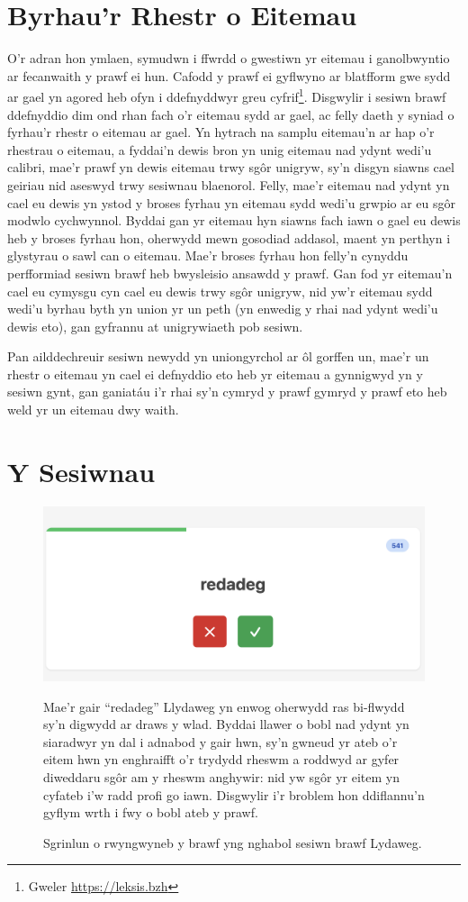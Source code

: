\section{Byrhau'r Rhestr o Eitemau}
O'r adran hon ymlaen, symudwn i ffwrdd o gwestiwn yr eitemau i ganolbwyntio ar fecanwaith y prawf ei hun. Cafodd y prawf ei gyflwyno ar blatfform gwe sydd ar gael yn agored heb ofyn i ddefnyddwyr greu cyfrif\footnote{Gweler \href{https://leksis.bzh}{https://leksis.bzh}}. Disgwylir i sesiwn brawf ddefnyddio dim ond rhan fach o'r eitemau sydd ar gael, ac felly daeth y syniad o fyrhau'r rhestr o eitemau ar gael. Yn hytrach na samplu eitemau'n ar hap o'r rhestrau o eitemau, a fyddai'n dewis bron yn unig eitemau nad ydynt wedi'u calibri, mae'r prawf yn dewis eitemau trwy sgôr unigryw, sy'n disgyn siawns cael geiriau nid aseswyd trwy sesiwnau blaenorol. Felly, mae'r eitemau nad ydynt yn cael eu dewis yn ystod y broses fyrhau yn eitemau sydd wedi'u grwpio ar eu sgôr modwlo cychwynnol. Byddai gan yr eitemau hyn siawns fach iawn o gael eu dewis heb y broses fyrhau hon, oherwydd mewn gosodiad addasol, maent yn perthyn i glystyrau o sawl can o eitemau. Mae'r broses fyrhau hon felly'n cynyddu perfformiad sesiwn brawf heb bwysleisio ansawdd y prawf. Gan fod yr eitemau'n cael eu cymysgu cyn cael eu dewis trwy sgôr unigryw, nid yw'r eitemau sydd wedi'u byrhau byth yn union yr un peth (yn enwedig y rhai nad ydynt wedi'u dewis eto), gan gyfrannu at unigrywiaeth pob sesiwn. 

Pan ailddechreuir sesiwn newydd yn uniongyrchol ar ôl gorffen un, mae'r un rhestr o eitemau yn cael ei defnyddio eto heb yr eitemau a gynnigwyd yn y sesiwn gynt, gan ganiatáu i'r rhai sy'n cymryd y prawf gymryd y prawf eto heb weld yr un eitemau dwy waith.

\section{Y Sesiwnau}
\begin{figure}
    \centering
    \includegraphics[width=0.5\linewidth]{figures/screenshot-redadeg.png}
    \caption{Sgrinlun o rwyngwyneb y brawf yng nghabol sesiwn brawf Lydaweg.}
    \medskip
    \small
    Mae'r gair ``redadeg'' Llydaweg yn enwog oherwydd ras bi-flwydd sy'n digwydd ar draws y wlad. Byddai llawer o bobl nad ydynt yn siaradwyr yn dal i adnabod y gair hwn, sy'n gwneud yr ateb o'r eitem hwn yn enghraifft o'r trydydd rheswm a roddwyd ar gyfer diweddaru sgôr am y rheswm anghywir: nid yw sgôr yr eitem yn cyfateb i'w radd profi go iawn. Disgwylir i'r broblem hon ddiflannu'n gyflym wrth i fwy o bobl ateb y prawf.
\end{figure}\label{fig:screenshot}

